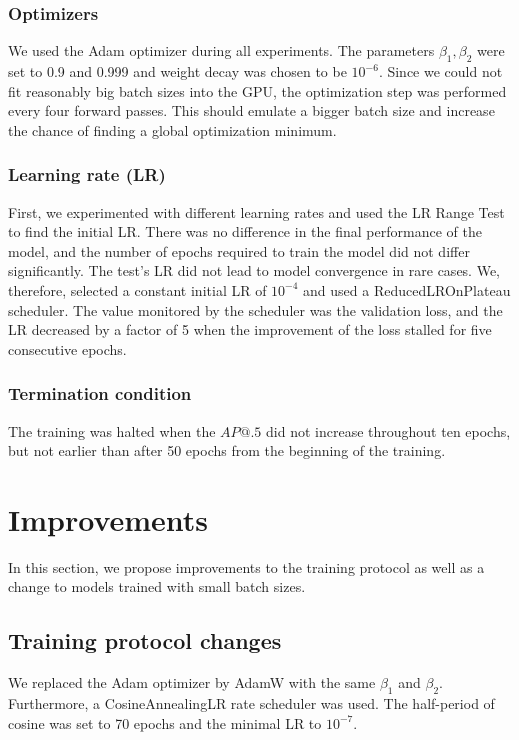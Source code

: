 \subsubsection{Optimizers}
We used the Adam optimizer during all experiments. The parameters $\beta_1, \beta_2$ were set to 0.9 and 0.999 and weight decay was chosen to be $10^{-6}$. Since we could not fit reasonably big batch sizes into the GPU, the optimization step was performed every four forward passes. This should emulate a bigger batch size and increase the chance of finding a global optimization minimum.

\subsubsection{Learning rate (LR)}
First, we experimented with different learning rates and used the LR Range Test to find the initial LR. There was no difference in the final performance of the model, and the number of epochs required to train the model did not differ significantly. The test's LR did not lead to model convergence in rare cases. We, therefore, selected a constant initial LR of $10^{-4}$ and used a ReducedLROnPlateau scheduler. The value monitored by the scheduler was the validation loss, and the LR decreased by a factor of 5 when the improvement of the loss stalled for five consecutive epochs.
\subsubsection{Termination condition}
The training was halted when the $AP@.5$ did not increase throughout ten epochs, but not earlier than after 50 epochs from the beginning of the training.

\section{Improvements}
\label{sec:methods:improvements}
In this section, we propose improvements to the training protocol as well as a change to models trained with small batch sizes.
\subsection{Training protocol changes}
\label{sec:general_changes}
We replaced the Adam optimizer by AdamW with the same $\beta_1$ and $\beta_2$. Furthermore, a CosineAnnealingLR rate scheduler was used. The half-period of cosine was set to 70 epochs and the minimal LR to $10^{-7}$.

